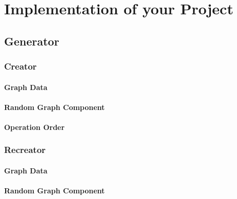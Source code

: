 \chapter{Implementation of your Project}
\label{ch:implementation}

\section{Generator}

\subsection{Creator}

\subsubsection{Graph Data}

\subsubsection{Random Graph Component}

\subsubsection{Operation Order}

\subsection{Recreator}

\subsubsection{Graph Data}

\subsubsection{Random Graph Component}

